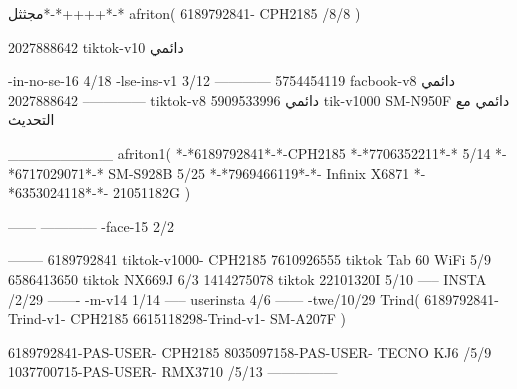 مجثثل*-*++++*-*
afriton(
6189792841- CPH2185  /8/8
)

2027888642 tiktok-v10
دائمي

-in-no-se-16 4/18
-lse-ins-v1 3/12
------------
5754454119 facbook-v8
دائمي
--------------
2027888642 tiktok-v8
دائمي
5909533996 tik-v1000  SM-N950F
دائمي مع التحديث

__________
afriton1(
*-*6189792841*-*-CPH2185
*-*7706352211*-* 5/14
*-*6717029071*-*  SM-S928B 5/25
*-*7969466119*-*- Infinix X6871 \5
*-*6353024118*-*- 21051182G \5
)


------
------------
-face-15 2/2

--------
6189792841 tiktok-v1000- CPH2185 
7610926555 tiktok Tab 60 WiFi  5/9
6586413650 tiktok NX669J  6/3
1414275078 tiktok 22101320I  5/10
-----
 INSTA /2/29
-------
-m-v14 1/14
-----
userinsta 4/6
------
-twe/10/29
Trind(
6189792841-Trind-v1- CPH2185 
6615118298-Trind-v1- SM-A207F \5\9
)

6189792841-PAS-USER- CPH2185 
8035097158-PAS-USER- TECNO KJ6  /5/9
1037700715-PAS-USER- RMX3710  /5/13
    ---------------
